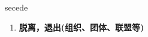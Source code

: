 
\begin{frame}
{\huge secede}
\begin{center}
\begin{enumerate}\Large
  \item \textbf{脱离，退出(组织、团体、联盟等)}
\end{enumerate}
\end{center}
\end{frame}
